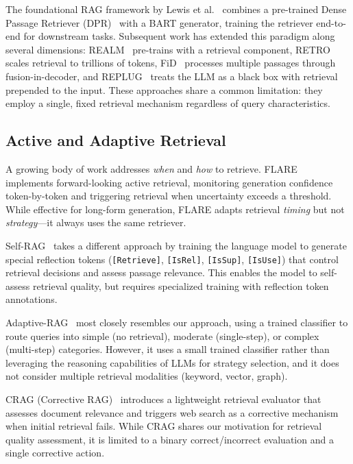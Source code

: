 \documentclass[runningheads]{llncs}
\begin{document}
The foundational RAG framework by Lewis et al.~\cite{Lewis2020} combines a pre-trained Dense Passage Retriever (DPR)~\cite{Karpukhin2020} with a BART generator, training the retriever end-to-end for downstream tasks. Subsequent work has extended this paradigm along several dimensions: REALM~\cite{Guu2020} pre-trains with a retrieval component, RETRO~\cite{Borgeaud2022} scales retrieval to trillions of tokens, FiD~\cite{Izacard2021} processes multiple passages through fusion-in-decoder, and REPLUG~\cite{Shi2023} treats the LLM as a black box with retrieval prepended to the input. These approaches share a common limitation: they employ a single, fixed retrieval mechanism regardless of query characteristics.

\subsection{Active and Adaptive Retrieval}

A growing body of work addresses \textit{when} and \textit{how} to retrieve. FLARE~\cite{Jiang2023} implements forward-looking active retrieval, monitoring generation confidence token-by-token and triggering retrieval when uncertainty exceeds a threshold. While effective for long-form generation, FLARE adapts retrieval \textit{timing} but not \textit{strategy}---it always uses the same retriever.

Self-RAG~\cite{Asai2023} takes a different approach by training the language model to generate special reflection tokens (\texttt{[Retrieve]}, \texttt{[IsRel]}, \texttt{[IsSup]}, \texttt{[IsUse]}) that control retrieval decisions and assess passage relevance. This enables the model to self-assess retrieval quality, but requires specialized training with reflection token annotations.

Adaptive-RAG~\cite{Jeong2024} most closely resembles our approach, using a trained classifier to route queries into simple (no retrieval), moderate (single-step), or complex (multi-step) categories. However, it uses a small trained classifier rather than leveraging the reasoning capabilities of LLMs for strategy selection, and it does not consider multiple retrieval modalities (keyword, vector, graph).

CRAG (Corrective RAG)~\cite{Yan2024} introduces a lightweight retrieval evaluator that assesses document relevance and triggers web search as a corrective mechanism when initial retrieval fails. While CRAG shares our motivation for retrieval quality assessment, it is limited to a binary correct/incorrect evaluation and a single corrective action.
\end{document}

